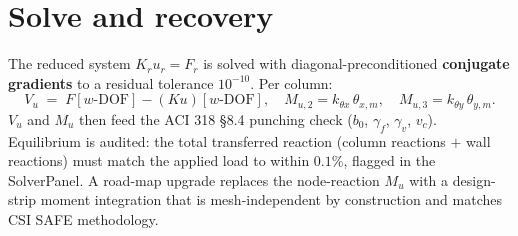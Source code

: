 \documentclass[10pt]{article}
\begin{document}
\section*{Solve and recovery}
The reduced system $K_r u_r = F_r$ is solved with diagonal-preconditioned \textbf{conjugate gradients} to a residual tolerance $10^{-10}$. Per column:
\[
V_u \;=\; F[w\text{-DOF}] - (K u)[w\text{-DOF}],\quad
M_{u,2} = k_{\theta x}\,\theta_{x,m},\quad
M_{u,3} = k_{\theta y}\,\theta_{y,m}.
\]
$V_u$ and $M_u$ then feed the ACI 318 \S8.4 punching check ($b_0$, $\gamma_f$, $\gamma_v$, $v_c$). Equilibrium is audited: the total transferred reaction (column reactions $+$ wall reactions) must match the applied load to within $0.1\%$, flagged in the SolverPanel. A road-map upgrade replaces the node-reaction $M_u$ with a design-strip moment integration that is mesh-independent by construction and matches CSI SAFE methodology.
\end{document}
